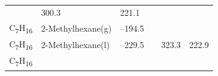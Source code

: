 \documentclass[
  9pt,
]{extbook}
\theoremstyle{definition}
\theoremstyle{definition}
\theoremstyle{definition}
\theoremstyle{remark}
\begin{document}
\begin{longtable}[]{@{}llllll@{}}
\begin{minipage}[t]{0.15\columnwidth}
\strut
\end{minipage} & \begin{minipage}[t]{0.14\columnwidth}\raggedright
300.3\strut
\end{minipage} & \begin{minipage}[t]{0.14\columnwidth}\raggedright
221.1\strut
\end{minipage}\tabularnewline
\begin{minipage}[t]{0.07\columnwidth}\raggedright
C\textsubscript{7}H\textsubscript{16}\strut
\end{minipage} & \begin{minipage}[t]{0.17\columnwidth}\raggedright
2-Methylhexane(g)\strut
\end{minipage} & \begin{minipage}[t]{0.15\columnwidth}\raggedright
--194.5\strut
\end{minipage} & \begin{minipage}[t]{0.15\columnwidth}\raggedright
\strut
\end{minipage} & \begin{minipage}[t]{0.14\columnwidth}\raggedright
\strut
\end{minipage} & \begin{minipage}[t]{0.14\columnwidth}\raggedright
\strut
\end{minipage}\tabularnewline
\begin{minipage}[t]{0.07\columnwidth}\raggedright
C\textsubscript{7}H\textsubscript{16}\strut
\end{minipage} & \begin{minipage}[t]{0.17\columnwidth}\raggedright
2-Methylhexane(l)\strut
\end{minipage} & \begin{minipage}[t]{0.15\columnwidth}\raggedright
--229.5\strut
\end{minipage} & \begin{minipage}[t]{0.15\columnwidth}\raggedright
\strut
\end{minipage} & \begin{minipage}[t]{0.14\columnwidth}\raggedright
323.3\strut
\end{minipage} & \begin{minipage}[t]{0.14\columnwidth}\raggedright
222.9\strut
\end{minipage}\tabularnewline
\begin{minipage}[t]{0.07\columnwidth}\raggedright
C\textsubscript{7}H\textsubscript{16}\strut
\end{minipage} & \begin{minipage}[t]{0.17\columnwidth}\raggedright

\end{minipage}
\end{longtable}
\end{document}

